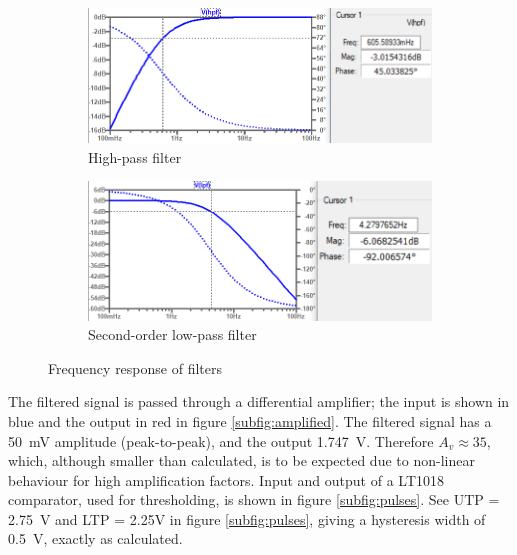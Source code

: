 \begin{figure}[h]
 \footnotesize
   \centering
   \begin{subfigure}[]{0.48\textwidth}
        \includegraphics[width=\linewidth]{./Figures/hpf}
	  \caption{High-pass filter} \label{subfig:hpf}	
   \end{subfigure}
   \begin{subfigure}[]{0.48\textwidth}
  	 \includegraphics[width=\linewidth]{./Figures/lpf1}
	  \caption{Second-order low-pass filter} \label{subfig:lpf1}	
   \end{subfigure}
   \caption {Frequency response of filters}
   \label{fig:freqreq}
 \end{figure}

The filtered signal is passed through a differential amplifier; the input is shown in blue and the output in red in figure \ref{subfig:amplified}. The filtered signal has a \SI{50}{mV} amplitude (peak-to-peak), and the output \SI{1.747}{V}. Therefore $A_v \approx 35$, which, although smaller than calculated, is to be expected due to non-linear behaviour for high amplification factors. Input and output of a LT1018 comparator, used for thresholding, is shown in figure \ref{subfig:pulses}.  See UTP = \SI{2.75}{V} and LTP = {2.25}{V} in figure \ref{subfig:pulses}, giving a hysteresis width of \SI{0.5}{V}, exactly as calculated.

